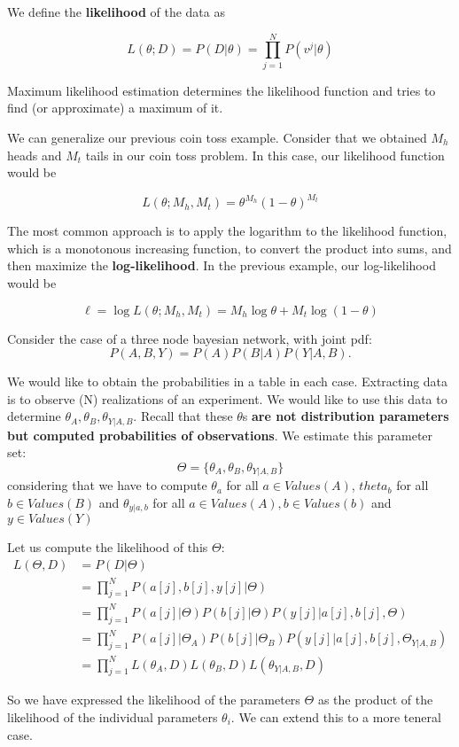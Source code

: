 \documentclass[
]{article}
\begin{document}
We define the \textbf{likelihood} of the data as

\[
L(\theta;D) = P(D|\theta) = \prod_{j=1}^N P(v^j|\theta)
\]

Maximum likelihood estimation determines the likelihood function and
tries to find (or approximate) a maximum of it.

We can generalize our previous coin toss example. Consider that we
obtained \(M_h\) heads and \(M_t\) tails in our coin toss problem. In
this case, our likelihood function would be

\[
L(\theta; M_h,M_t) = \theta^{M_h} (1-\theta)^{M_t}
\]

The most common approach is to apply the logarithm to the likelihood
function, which is a monotonous increasing function, to convert the
product into sums, and then maximize the \textbf{log-likelihood}. In the
previous example, our log-likelihood would be

\[
\ell = \log L(\theta; M_h,M_t) = M_h \log \theta + M_t \log (1-\theta)
\]

Consider the case of a three node bayesian network, with joint pdf: \[
P(A,B,Y) = P(A)P(B|A)P(Y|A,B).
\]

We would like to obtain the probabilities in a table in each case.
Extracting data is to observe (N) realizations of an experiment. We
would like to use this data to determine
\(\theta_A,\theta_B,\theta_{Y|A,B}\). Recall that these \(\theta\)s
\textbf{are not distribution parameters but computed probabilities of
observations}. We estimate this parameter set: \[
\Theta = \{\theta_A,\theta_B,\theta_{Y|A,B}\}
\] considering that we have to compute \(\theta_a\) for all
\(a \in Values(A)\), \(theta_b\) for all \(b \in Values(B)\) and
\(\theta_{y|a,b}\) for all \(a\in Values(A), b \in Values(b)\) and
\(y \in Values(Y)\)

Let us compute the likelihood of this \(\Theta\): \begin{align*}
L(\Theta,D) & = P(D|\Theta) \\
& = \prod_{j=1}^N P(a[j],b[j],y[j]|\Theta) \\
& = \prod_{j=1}^N P(a[j]|\Theta) P(b[j]|\Theta)P(y[j]|a[j],b[j],\Theta)\\
& = \prod_{j=1}^N P(a[j]|\Theta_A) P(b[j]| \Theta_B)P(y[j] | a[j],b[j],\Theta_{Y|A,B})\\
& = \prod_{j=1}^N L(\theta_A,D) L(\theta_B,D) L(\theta_{Y|A,B},D)
\end{align*}

So we have expressed the likelihood of the parameters \(\Theta\) as the
product of the likelihood of the individual parameters \(\theta_i\). We
can extend this to a more teneral case.
\end{document}
